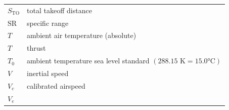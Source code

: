 \documentclass[
]{book}
\begin{document}
\begin{longtable}[]{@{}ll@{}}
\begin{minipage}[t]{0.14\columnwidth}
\(S_{\mathrm{TO}}\)\strut
\end{minipage} & \begin{minipage}[t]{0.80\columnwidth}\raggedright
total takeoff distance\strut
\end{minipage}\tabularnewline
\begin{minipage}[t]{0.14\columnwidth}\raggedright
\(\mathrm{SR}\)\strut
\end{minipage} & \begin{minipage}[t]{0.80\columnwidth}\raggedright
specific range\strut
\end{minipage}\tabularnewline
\begin{minipage}[t]{0.14\columnwidth}\raggedright
\(T\)\strut
\end{minipage} & \begin{minipage}[t]{0.80\columnwidth}\raggedright
ambient air temperature (absolute)\strut
\end{minipage}\tabularnewline
\begin{minipage}[t]{0.14\columnwidth}\raggedright
\(T\)\strut
\end{minipage} & \begin{minipage}[t]{0.80\columnwidth}\raggedright
thrust\strut
\end{minipage}\tabularnewline
\begin{minipage}[t]{0.14\columnwidth}\raggedright
\(T_0\)\strut
\end{minipage} & \begin{minipage}[t]{0.80\columnwidth}\raggedright
ambient temperature sea level standard \(\left( 288.15\text{ K} = 15.0°\text{C} \right)\)\strut
\end{minipage}\tabularnewline
\begin{minipage}[t]{0.14\columnwidth}\raggedright
\(V\)\strut
\end{minipage} & \begin{minipage}[t]{0.80\columnwidth}\raggedright
inertial speed\strut
\end{minipage}\tabularnewline
\begin{minipage}[t]{0.14\columnwidth}\raggedright
\(V_c\)\strut
\end{minipage} & \begin{minipage}[t]{0.80\columnwidth}\raggedright
calibrated airspeed\strut
\end{minipage}\tabularnewline
\begin{minipage}[t]{0.14\columnwidth}\raggedright
\(V_e\)\strut
\end{minipage} & \begin{minipage}[t]{0.80\columnwidth}\raggedright

\end{minipage}
\end{longtable}
\end{document}
